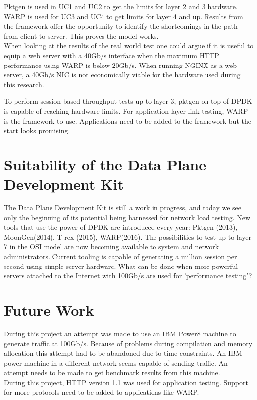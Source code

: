 Pktgen is used in UC1 and UC2 to get the limits for layer 2 and 3 hardware.
WARP is used for UC3 and UC4 to get limits for layer 4 and up. 
Results from the framework offer the opportunity to identify the shortcomings in the path from client to server.
This proves the model works. \\
 
When looking at the results of the real world test one could argue if it is useful to equip a web server with a 40Gb/s interface when the maximum HTTP performance using WARP is below 20Gb/s.
When running NGINX as a web server, a 40Gb/s NIC is not economically viable for the hardware used during this research. 

To perform session based throughput tests up to layer 3, pktgen on top of DPDK is capable of reaching hardware limits.
For application layer link testing, WARP is the framework to use. Applications need to be added to the framework but the start looks promising.

\section{Suitability of the Data Plane Development Kit}
The Data Plane Development Kit is still a work in progress, and today we see only the beginning of its potential being harnessed for network load testing. New tools that use the power of DPDK are introduced every year:
Pktgen (2013), MoonGen(2014), T-rex (2015), WARP(2016).
The possibilities to test up to layer 7 in the OSI model are now becoming available to system and network administrators. 
Current tooling is capable of generating a million session per second using simple server hardware. 
What can be done when more powerful servers attached to the Internet with 100Gb/s are used for 'performance testing'?  

\section{Future Work}
During this project an attempt was  made to use an IBM Power8 machine to generate traffic at 100Gb/s. Because of problems during compilation and memory allocation this attempt had to be abandoned due to time constraints.
An IBM power machine in a different network seems capable of sending traffic. An attempt needs to be made to get benchmark results from this machine.\\

During this project, HTTP version 1.1 was used for application testing. Support for more protocols need to be added to applications like WARP.  \\

